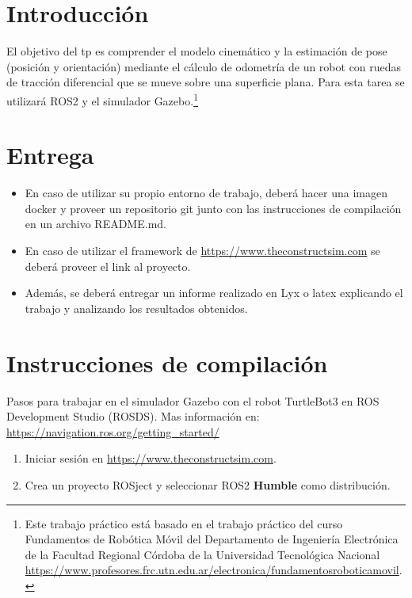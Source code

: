\documentclass[tp]{lcc}
\begin{document}
\maketitle


\section{Introducción}

El objetivo del tp es comprender el modelo cinemático y la estimación de pose (posición y orientación) mediante el cálculo de odometría de un robot con ruedas de tracción diferencial que se mueve sobre una superficie plana. Para esta tarea se utilizará ROS2 y el simulador Gazebo.\footnote{Este trabajo práctico está basado en el trabajo práctico del curso Fundamentos de Robótica Móvil del Departamento de Ingeniería Electrónica de la Facultad Regional Córdoba de la Universidad Tecnológica Nacional \url{https://www.profesores.frc.utn.edu.ar/electronica/fundamentosroboticamovil}.}


\section{Entrega}
\begin{itemize}
    \item En caso de utilizar su propio entorno de trabajo, deberá hacer una imagen docker y proveer un repositorio git junto con las instrucciones de compilación en un archivo README.md.

    \item En caso de utilizar el framework de \url{https://www.theconstructsim.com} se deberá proveer el link al proyecto.

    \item Además, se deberá entregar un informe realizado en Lyx o latex explicando el trabajo y analizando los resultados obtenidos.
\end{itemize}


\section{Instrucciones de compilación}
Pasos para trabajar en el simulador Gazebo con el robot TurtleBot3 en ROS Development Studio (ROSDS). Mas información en: \url{https://navigation.ros.org/getting_started/}

\begin{enumerate}
	\item Iniciar sesión en \url{https://www.theconstructsim.com}.
	\item Crea un proyecto ROSject y seleccionar ROS2 {\bf Humble} como distribución.
\end{enumerate}
\end{document}
